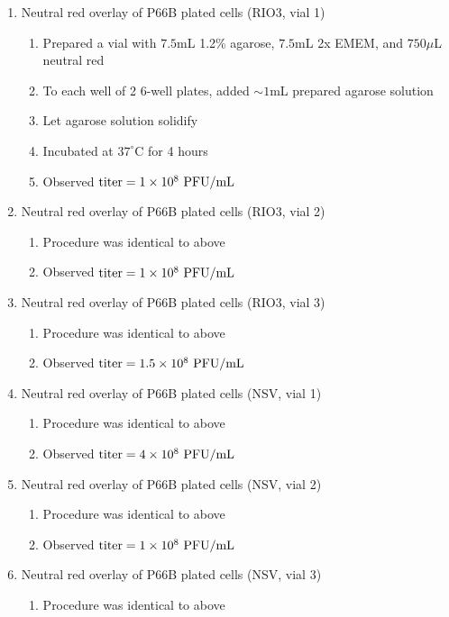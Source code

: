 \begin{enumerate}
	\item Neutral red overlay of P66B plated cells (RIO3, vial 1)
		\begin{enumerate}
			\item Prepared a vial with $7.5$mL 1.2\% agarose, $7.5$mL 2x EMEM, and $750\mu$L neutral red
			\item To each well of 2 6-well plates, added $\sim 1$mL prepared agarose solution
			\item Let agarose solution solidify
			\item Incubated at $37^{\circ}$C for 4 hours
			\item Observed $\text{titer}=1\times 10^{8}\text{ PFU/mL}$
		\end{enumerate}
	\item Neutral red overlay of P66B plated cells (RIO3, vial 2)
		\begin{enumerate}
			\item Procedure was identical to above
			\item Observed $\text{titer}=1\times 10^{8}\text{ PFU/mL}$
		\end{enumerate}
	\item Neutral red overlay of P66B plated cells (RIO3, vial 3)
		\begin{enumerate}
			\item Procedure was identical to above
			\item Observed $\text{titer}=1.5\times 10^{8}\text{ PFU/mL}$
		\end{enumerate}
	\item Neutral red overlay of P66B plated cells (NSV, vial 1)
		\begin{enumerate}
			\item Procedure was identical to above
			\item Observed $\text{titer}=4\times 10^{8}\text{ PFU/mL}$
		\end{enumerate}
	\item Neutral red overlay of P66B plated cells (NSV, vial 2)
		\begin{enumerate}
			\item Procedure was identical to above
			\item Observed $\text{titer}=1\times 10^{8}\text{ PFU/mL}$
		\end{enumerate}
	\item Neutral red overlay of P66B plated cells (NSV, vial 3)
		\begin{enumerate}
			\item Procedure was identical to above

\end{enumerate}
\end{enumerate}
